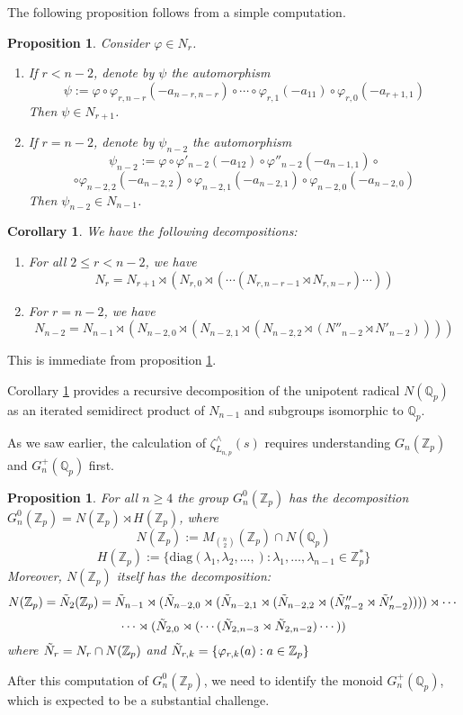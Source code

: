 \documentclass[12pt]{article}
\newtheorem{proposition}[theorem]{Proposition}
\newtheorem{corollary}[theorem]{Corollary}
\begin{document}
The following proposition follows from a simple computation.
\begin{proposition}
\label{prop:psi.automorphism}
Consider $\varphi\in{N_{r}}$.
\begin{enumerate}
    \item 
If $r<n-2$, denote by $\psi$ the automorphism \[\psi:=\varphi\circ\varphi_{r,n-r}(-a_{n-r,n-r})\circ\cdots\circ\varphi_{r,1}(-a_{11})\circ\varphi_{r,0}(-a_{r+1,1})\]
Then $\psi\in{N_{r+1}}$.
    \item 
If $r=n-2$, denote by $\psi_{n-2}$ the automorphism \[\psi_{n-2}:=\varphi\circ\varphi'_{n-2}(-a_{12})\circ\varphi''_{n-2}(-a_{n-1,1})\circ\]\[\circ\varphi_{n-2,2}(-a_{n-2,2})\circ\varphi_{n-2,1}(-a_{n-2,1})\circ\varphi_{n-2,0}(-a_{n-2,0})\]
Then $\psi_{n-2}\in{N_{n-1}}$.
\end{enumerate}
\end{proposition}
\begin{corollary}
\label{cor:Nr.decomposition}
We have the following decompositions:
\begin{enumerate}
    \item 
For all $2\leq{r}<{n-2}$, we have \[N_{r}=N_{r+1}\rtimes(N_{r,0}\rtimes(\cdots(N_{r,n-r-1}\rtimes{N_{r,n-r}})\cdots))\]
\item For $r=n-2$, we have 
\[N_{n-2}=N_{n-1}\rtimes({N_{n-2,0}}\rtimes(N_{n-2,1}\rtimes(N_{n-2,2}\rtimes(N''_{n-2}\rtimes{N'_{n-2}}))))\]
\end{enumerate}
\end{corollary}
This is immediate from proposition \ref{prop:psi.automorphism}.

Corollary \ref{cor:Nr.decomposition} provides a recursive decomposition of the unipotent radical $N(\mathbb{Q}_{p})$ as an iterated semidirect product of $N_{n-1}$ and subgroups isomorphic to $\mathbb{Q}_{p}$.

As we saw earlier, the calculation of $\zeta_{L_{n,p}}^{\wedge}(s)$ requires understanding $G_{n}(\mathbb{Z}_p)$ and $G_{n}^{+}(\mathbb{Q}_p)$ first. 
\begin{proposition}
\label{prop:G.n.Zp.decomposition}
For all $n\geq{4}$ the group $G_{n}^{0}(\mathbb{Z}_{p})$ has the decomposition $G_{n}^{0}(\mathbb{Z}_{p})=N(\mathbb{Z}_{p})\rtimes{H(\mathbb{Z}_{p})}$, where \[N(\mathbb{Z}_{p}):=M_{\binom{n}{2}}(\mathbb{Z}_{p})\cap{N(\mathbb{Q}_{p})}\]
\[H(\mathbb{Z}_{p}):=\{\mathrm{diag}(\lambda_{1},\lambda_{2},\dots,) : \lambda_1,\dots,\lambda_{n-1}\in\mathbb{Z}_{p}^{\ast}\}\]
Moreover, $N(\mathbb{Z}_{p})$ itself has the decomposition: \[N(\mathbb{Z}_{p})=\Tilde{N}_{2}(\mathbb{Z}_{p})=
\Tilde{N}_{n-1}\rtimes({\Tilde{N}_{n-2,0}}\rtimes(\Tilde{N}_{n-2,1}\rtimes(\Tilde{N}_{n-2,2}\rtimes(\Tilde{N}''_{n-2}\rtimes{\Tilde{N}'_{n-2}}))))\rtimes\cdots\]\[\cdots\rtimes{(\Tilde{N}_{2,0}\rtimes(\cdots(\Tilde{N}_{2,n-3}\rtimes{\Tilde{N}_{2,n-2}})\cdots))}
\]
where $\Tilde{N}_{r}=N_{r}\cap{N(\mathbb{Z}_{p})}$ and $\Tilde{N}_{r,k}=\{\varphi_{r,k}(a) : a\in\mathbb{Z}_{p}\}$
\end{proposition}
After this computation of $G_{n}^{0}(\mathbb{Z}_{p})$, we need to identify the monoid $G_{n}^{+}(\mathbb{Q}_p)$, which is expected to be a substantial challenge.
\end{document}
